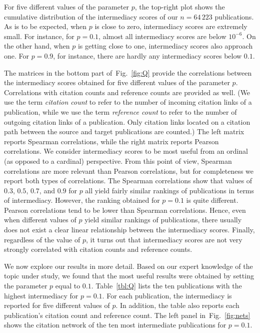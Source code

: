 \documentclass{article}
\theoremstyle{definition}
\newcommand{\figref}[1]{Fig.~\ref{fig:#1}\xspace}
\newcommand{\tblref}[1]{Table~\ref{tbl:#1}\xspace}
\begin{document}
For five different values of the parameter $p$, the top-right plot shows the cumulative distribution of the intermediacy scores of our $n = 64\,223$ publications. As is to be expected, when $p$ is close to zero, intermediacy scores are extremely small. For instance, for $p = 0.1$, almost all intermediacy scores are below $10^{-6}$. On the other hand, when $p$ is getting close to one, intermediacy scores also approach one. For $p = 0.9$, for instance, there are hardly any intermediacy scores below $0.1$.

The matrices in the bottom part of~\figref{Q} provide the correlations between the intermediacy scores obtained for five different values of the parameter $p$. Correlations with citation counts and reference counts are provided as well. (We use the term \emph{citation count} to refer to the number of incoming citation links of a publication, while we use the term \emph{reference count} to refer to the number of outgoing citation links of a publication. Only citation links located on a citation path between the source and target publications are counted.) The left matrix reports Spearman correlations, while the right matrix reports Pearson correlations. We consider intermediacy scores to be most useful from an ordinal (as opposed to a cardinal) perspective. From this point of view, Spearman correlations are more relevant than Pearson correlations, but for completeness we report both types of correlations. The Spearman correlations show that values of $0.3$, $0.5$, $0.7$, and $0.9$ for $p$ all yield fairly similar rankings of publications in terms of intermediacy. However, the ranking obtained for $p = 0.1$ is quite different. Pearson correlations tend to be lower than Spearman correlations. Hence, even when different values of $p$ yield similar rankings of publications, there usually does not exist a clear linear relationship between the intermediacy scores. Finally, regardless of the value of $p$, it turns out that intermediacy scores are not very strongly correlated with citation counts and reference counts.

We now explore our results in more detail. Based on our expert knowledge of the topic under study, we found that the most useful results were obtained by setting the parameter $p$ equal to $0.1$. \tblref{Q} lists the ten publications with the highest intermediacy for $p = 0.1$. For each publication, the intermediacy is reported for five different values of $p$. In addition, the table also reports each publication’s citation count and reference count. The left panel in~\figref{nets} shows the citation network of the ten most intermediate publications for $p = 0.1$.
\end{document}
